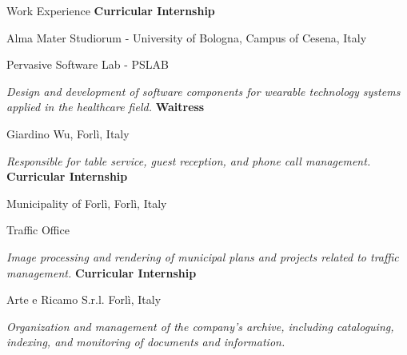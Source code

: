 \begin{rubric}{Work Experience}
\entry*[03/2021 -- 05/2021]%
	\textbf{Curricular Internship}
        \par Alma Mater Studiorum - University of Bologna, Campus of Cesena, Italy
        \par Pervasive Software Lab - PSLAB
        \par \textit{Design and development of software components for wearable technology systems applied in the healthcare field.}
%
%
\entry*[09/2018 -- 05/2019]%
	\textbf{Waitress} 
        \par Giardino Wu, Forlì, Italy
        \par \textit{Responsible for table service, guest reception, and phone call management.}
%
\entry*[01/2017 -- 02/2017]%
	\textbf{Curricular Internship} 
        \par Municipality of Forlì, Forlì, Italy
        \par Traffic Office
        \par \textit{Image processing and rendering of municipal plans and projects related to traffic management.}
%
\entry*[05/2016 -- 06/2016]%
	\textbf{Curricular Internship} 
        \par Arte e Ricamo S.r.l. Forlì, Italy
        \par \textit{Organization and management of the company's archive, including cataloguing, indexing, and monitoring of documents and information.}
%
\end{rubric}